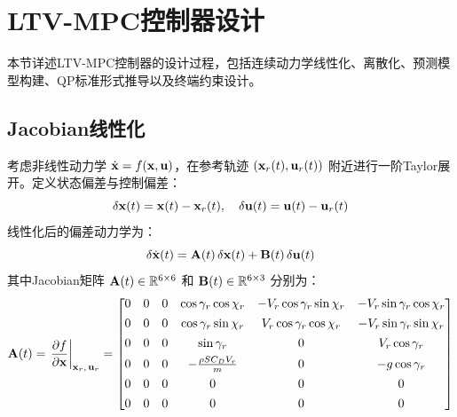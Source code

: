 \section{LTV-MPC控制器设计}\label{sec:mpc}

本节详述LTV-MPC控制器的设计过程，包括连续动力学线性化、离散化、预测模型构建、QP标准形式推导以及终端约束设计。

\subsection{Jacobian线性化}\label{sec:linearization}

考虑非线性动力学 $\dot{\mathbf{x}} = f(\mathbf{x}, \mathbf{u})$，在参考轨迹 $(\mathbf{x}_r(t), \mathbf{u}_r(t))$ 附近进行一阶Taylor展开。定义状态偏差与控制偏差：
\begin{equation}\label{eq:delta}
\delta\mathbf{x}(t) = \mathbf{x}(t) - \mathbf{x}_r(t), \quad \delta\mathbf{u}(t) = \mathbf{u}(t) - \mathbf{u}_r(t)
\end{equation}
线性化后的偏差动力学为：
\begin{equation}\label{eq:linearized}
\delta\dot{\mathbf{x}}(t) = \mathbf{A}(t)\,\delta\mathbf{x}(t) + \mathbf{B}(t)\,\delta\mathbf{u}(t)
\end{equation}
其中Jacobian矩阵 $\mathbf{A}(t) \in \mathbb{R}^{6 \times 6}$ 和 $\mathbf{B}(t) \in \mathbb{R}^{6 \times 3}$ 分别为：
\begin{equation}\label{eq:jacobian_A}
\mathbf{A}(t) = \left.\frac{\partial f}{\partial \mathbf{x}}\right|_{\mathbf{x}_r,\,\mathbf{u}_r} = 
\begin{bmatrix}
0 & 0 & 0 & \cos\gamma_r\cos\chi_r & -V_r\cos\gamma_r\sin\chi_r & -V_r\sin\gamma_r\cos\chi_r \\[4pt]
0 & 0 & 0 & \cos\gamma_r\sin\chi_r & V_r\cos\gamma_r\cos\chi_r & -V_r\sin\gamma_r\sin\chi_r \\[4pt]
0 & 0 & 0 & \sin\gamma_r & 0 & V_r\cos\gamma_r \\[4pt]
0 & 0 & 0 & -\frac{\rho S C_D V_r}{m} & 0 & -g\cos\gamma_r \\[4pt]
0 & 0 & 0 & 0 & 0 & 0 \\[4pt]
0 & 0 & 0 & 0 & 0 & 0
\end{bmatrix}
\end{equation}


